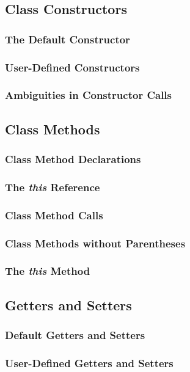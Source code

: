 \documentclass[10pt,twoside,titlepage]{article}
\begin{document}
\subsection{Class Constructors}
\subsubsection{The Default Constructor}
\subsubsection{User-Defined Constructors}
\subsubsection{Ambiguities in Constructor Calls}
\subsection{Class Methods}
\subsubsection{Class Method Declarations}
\subsubsection{The {\em this} Reference}
\subsubsection{Class Method Calls}
\subsubsection{Class Methods without Parentheses}
\subsubsection{The {\em this} Method}
\subsection{Getters and Setters}
\subsubsection{Default Getters and Setters}
\subsubsection{User-Defined Getters and Setters}
\end{document}
